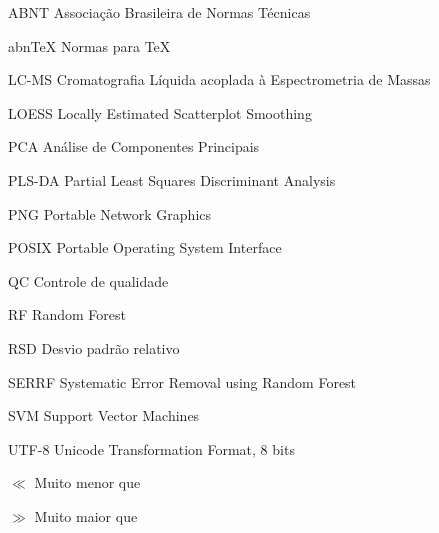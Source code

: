 \documentclass[
	12pt,					%
	openright,				%
	oneside,					%
	a4paper,					%
	english,					%
	portuguese					%
	]{abntex2}
\begin{document}
\begin{siglas}
  \item[ABNT] Associação Brasileira de Normas Técnicas
  \item[abnTeX] Normas para TeX
  \item[LC-MS] Cromatografia Líquida acoplada à Espectrometria de Massas
  \item[LOESS] Locally Estimated Scatterplot Smoothing
  \item[PCA] Análise de Componentes Principais
  \item[PLS-DA] Partial Least Squares Discriminant Analysis
  \item[PNG] Portable Network Graphics
  \item[POSIX] Portable Operating System Interface
  \item[QC] Controle de qualidade
  \item[RF] Random Forest
  \item[RSD] Desvio padrão relativo
  \item[SERRF] Systematic Error Removal using Random Forest
  \item[SVM] Support Vector Machines
  \item[UTF-8] Unicode Transformation Format, 8 bits
\end{siglas}

\begin{simbolos}
\item[$\ll$] Muito menor que
\item[$\gg$] Muito maior que
\end{simbolos}

\tableofcontents*
\cleardoublepage


\textual %

\cleardoublepage %


\setcounter{page}{16} %
\end{document}
